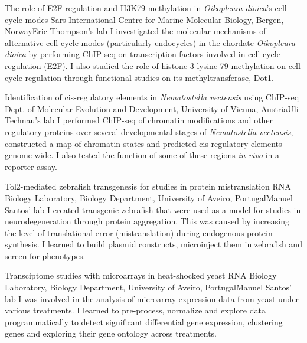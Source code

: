 \documentclass[11pt,a4paper,roman]{moderncv} %
\begin{document}
		{The role of E2F regulation and H3K79 methylation in \textit{Oikopleura dioica}'s cell cycle modes}
		{Sars International Centre for Marine Molecular Biology, Bergen, Norway}{Eric Thompson's lab}
		{}
		{I investigated the molecular mechanisms of alternative cell cycle modes (particularly endocycles) in the chordate \textit{Oikopleura dioica} by performing ChIP-seq on transcription factors involved in cell cycle regulation (E2F). I also studied the role of histone 3 lysine 79 methylation on cell cycle regulation through functional studies on its methyltransferase, Dot1.}
	
		{Identification of cis-regulatory elements in \textit{Nematostella vectensis} using ChIP-seq}
		{Dept. of Molecular Evolution and Development, University of Vienna, Austria}{Uli Technau's lab}
		{}
		{I performed ChIP-seq of chromatin modifications and other regulatory proteins over several developmental stages of \textit{Nematostella vectensis}, constructed a map of chromatin states and predicted cis-regulatory elements genome-wide. I also tested the function of some of these regions \textit{in vivo} in a reporter assay.}

		{Tol2-mediated zebrafish transgenesis for studies in protein mistranslation}
		{RNA Biology Laboratory, Biology Department, University of Aveiro, Portugal}{Manuel Santos' lab}
		{}
		{I created transgenic zebrafish that were used as a model for studies in neurodegeneration through protein aggregation. This was caused by increasing the level of translational error (mistranslation) during endogenous protein synthesis. I learned to build plasmid constructs, microinject them in zebrafish and screen for phenotypes.}

		{Transciptome studies with microarrays in heat-shocked yeast}
		{RNA Biology Laboratory, Biology Department, University of Aveiro, Portugal}{Manuel Santos' lab}
		{}
		{I was involved in the analysis of microarray expression data from yeast under various treatments. I learned to pre-process, normalize and explore data programmatically to detect significant differential gene expression, clustering genes and exploring their gene ontology across treatments.}

\end{document}
